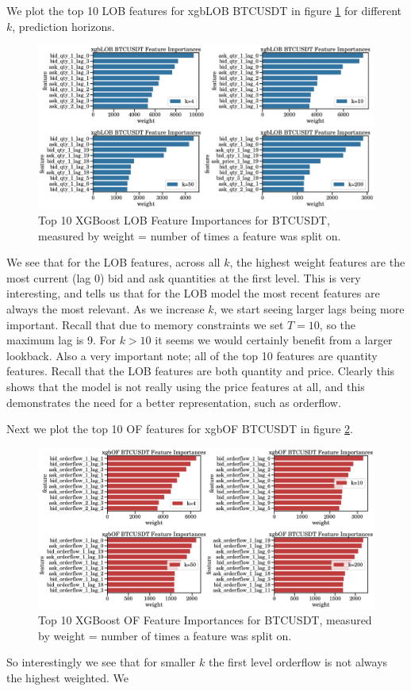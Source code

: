 \documentclass[a4paper, oneside, notitlepage]{book}
\begin{document}
We plot the top 10 LOB features for xgbLOB BTCUSDT in figure \ref{top_10_lob_features} for different $k$, prediction horizons.
\begin{figure}[htpb]
    \centering
    \includegraphics[width=1.0\textwidth]{./images/xgboost_LOB_BTCUSDT_top_10_feature_importances.png}
    \caption{Top 10 XGBoost LOB Feature Importances for BTCUSDT, measured by weight = number of times a feature was split on.}
    \label{top_10_lob_features}
\end{figure}
We see that for the LOB features, across all $k$, the highest weight features are 
the most current (lag 0) bid and ask quantities at the first level. This is very interesting,
and tells us that for the LOB model the most recent features are always the most relevant.
As we increase $k$, we start seeing larger lags being more important.  Recall that due to memory constraints
we set $T=10$, so the maximum lag is 9. For $k > 10$ it seems
we would certainly benefit from a larger lookback.
Also a very important note; all of the top 10 features are quantity features. Recall
that the LOB features are both quantity and price. Clearly this shows that the model
is not really using the price features at all, and this demonstrates the need for a better
representation, such as orderflow.

Next we plot the top 10 OF features for xgbOF BTCUSDT in figure \ref{top_10_of_features}.
\begin{figure}[htpb]
    \centering
    \includegraphics[width=1.0\textwidth]{./images/xgboost_OF_BTCUSDT_top_10_feature_importances.png}
    \caption{Top 10 XGBoost OF Feature Importances for BTCUSDT, measured by weight = number of times a feature was split on.}
    \label{top_10_of_features}
\end{figure}
So interestingly we see that for smaller $k$ the first level orderflow is not always the highest weighted.
We 
\end{document}
